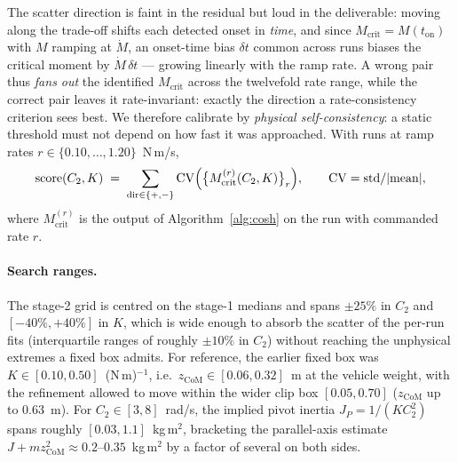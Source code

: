 \documentclass[10pt]{article}
\begin{document}
The scatter direction is faint in the residual but loud in the
deliverable: moving along the trade-off shifts each detected onset in
\emph{time}, and since $M_{\mathrm{crit}} = M(t_{\mathrm{on}})$ with
$M$ ramping at $\dot M$, an onset-time bias $\delta t$ common across
runs biases the critical moment by $\dot M\,\delta t$ — growing
linearly with the ramp rate. A wrong pair thus \emph{fans out} the
identified $M_{\mathrm{crit}}$ across the twelvefold rate range, while
the correct pair leaves it rate-invariant: exactly the direction a
rate-consistency criterion sees best. We therefore calibrate by
\emph{physical self-consistency}: a static threshold must not depend
on how fast it was approached. With runs at ramp rates
$r \in \{0.10,\dots,1.20\}$~N\,m/s,
\begin{equation}
\mathrm{score}(C_2, K) \;=\; \sum_{\mathrm{dir}\in\{+,-\}}
\mathrm{CV}\Bigl(\bigl\{ M_{\mathrm{crit}}^{(r)}(C_2, K)\bigr\}_{r}\Bigr),
\qquad \mathrm{CV} = \mathrm{std}/|\mathrm{mean}| ,
\label{eq:score}
\end{equation}
where $M_{\mathrm{crit}}^{(r)}$ is the output of
Algorithm~\ref{alg:cosh} on the run with commanded rate $r$.

\paragraph{Search ranges.} The stage-2 grid is centred on the stage-1
medians and spans $\pm25\%$ in $C_2$ and $[-40\%, +40\%]$ in $K$, which
is wide enough to absorb the scatter of the per-run fits (interquartile
ranges of roughly $\pm10\%$ in $C_2$) without reaching the unphysical
extremes a fixed box admits. For reference, the earlier fixed box was
$K \in [0.10, 0.50]$~(N\,m)$^{-1}$, i.e.\
$z_{\mathrm{CoM}} \in [0.06, 0.32]$~m at the vehicle weight, with the
refinement allowed to move within
the wider clip box $[0.05, 0.70]$ ($z_{\mathrm{CoM}}$ up to
$0.63$~m). For $C_2 \in [3, 8]$~rad/s, the implied pivot inertia
$J_P = 1/(K C_2^2)$ spans roughly $[0.03, 1.1]$~kg\,m$^2$, bracketing
the parallel-axis estimate
$J + m z_{\mathrm{CoM}}^2 \approx 0.2$--$0.35$~kg\,m$^2$ by a factor of
several on both sides.
\end{document}
